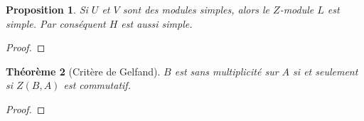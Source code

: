 \documentclass[francais,a4paper,11pt,reqno]{amsart}
\theoremstyle{plain}
\newtheorem{THEO}{\bf Théorème}[section]
\newtheorem{PROP}[THEO]{\bf Proposition}
\theoremstyle{definition}
\theoremstyle{remark}
\begin{document}
\begin{PROP}
  Si $U$ et $V$ sont des modules simples, alors le $Z$-module $L$ est
  simple. Par conséquent $H$ est aussi simple.
\end{PROP}
\begin{proof}
  \TODO{}
\end{proof}
\begin{THEO}[Critère de Gelfand]
  $B$ est sans multiplicité sur $A$ si et seulement si $Z(B, A)$ est
  commutatif.
\end{THEO}
\begin{proof}
  \TODO{}
\end{proof}
\end{document}
